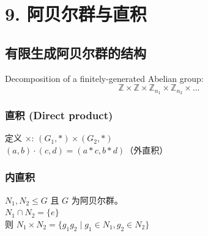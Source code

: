 \documentclass[12pt, a4paper]{article}
\begin{document}
\section*{9. 阿贝尔群与直积}

\subsection*{有限生成阿贝尔群的结构}
Decomposition of a finitely-generated Abelian group:
\[
\mathbb{Z} \times \mathbb{Z} \times \mathbb{Z}_{n_1} \times \mathbb{Z}_{n_2} \times \dots
\]

\subsubsection*{直积 (Direct product)}
定义 $\times$: $(G_1, *) \times (G_2, *)$ \\
$(a,b) \cdot (c,d) = (a*c, b*d)$（外直积）

\subsubsection*{内直积}
$N_1, N_2 \leq G$ 且 $G$ 为阿贝尔群。\\
$N_1 \cap N_2 = \{e\}$ \\
则 $N_1 \times N_2 = \{g_1 g_2 \mid g_1 \in N_1, g_2 \in N_2\}$
\end{document}
